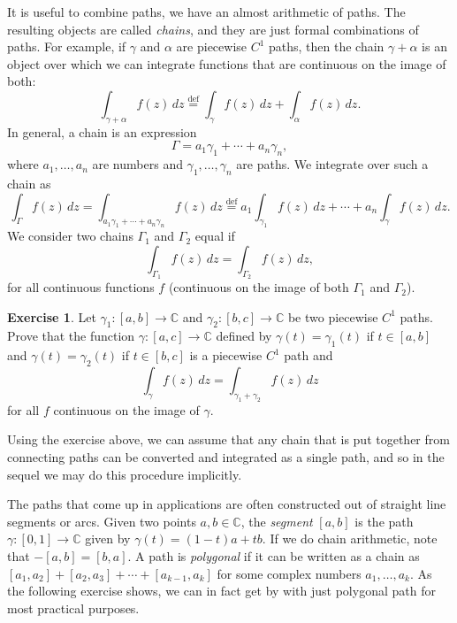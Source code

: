 \documentclass[12pt,openany]{book}
\newcommand{\C}{{\mathbb{C}}}
\newcommand{\myindex}[1]{#1\index{#1}}
\theoremstyle{plain}
\theoremstyle{remark}
\theoremstyle{definition}
\newenvironment{exbox}{%
    \def\FrameCommand{\vrule width 1pt \relax\hspace {10pt}}%
    \MakeFramed {\advance \hsize -\width \FrameRestore }%
}{%
    \endMakeFramed
}
\theoremstyle{exercise}
\newtheorem{exercise}{Exercise}[section]
\theoremstyle{example}
\begin{document}
It is useful to combine paths, we have an almost arithmetic of paths.
The resulting objects are called \emph{chains}, and they
are just formal combinations of paths.  For example, if $\gamma$
and $\alpha$ are piecewise $C^1$ paths, then the chain  $\gamma+\alpha$
is an object over which we can integrate functions that are continuous
on the image of both:
\begin{equation*}
\int_{\gamma + \alpha} f(z) \, dz
\overset{\text{def}}{=}
\int_{\gamma} f(z) \, dz +
\int_{\alpha} f(z) \, dz .
\end{equation*}
In general, a chain is an expression
\begin{equation*}
\Gamma = a_1 \gamma_1 + \cdots + a_n \gamma_n ,
\end{equation*}
where $a_1,\ldots,a_n$ are numbers and $\gamma_1,\ldots,\gamma_n$
are paths.  We integrate over such a chain as
\begin{equation*}
\int_{\Gamma} f(z) \, dz
=
\int_{a_1 \gamma_1 + \cdots + a_n \gamma_n} f(z) \, dz
\overset{\text{def}}{=}
a_1 \int_{\gamma_1} f(z) \, dz +
\cdots
+
a_n \int_{\gamma} f(z) \, dz .
\end{equation*}
We consider two chains $\Gamma_1$ and $\Gamma_2$ equal if
\begin{equation*}
\int_{\Gamma_1} f(z) \, dz = 
\int_{\Gamma_2} f(z) \, dz ,
\end{equation*}
for all continuous functions $f$ (continuous on the image of both $\Gamma_1$
and $\Gamma_2$).

\begin{exbox}
\begin{exercise}
Let $\gamma_1 \colon [a,b] \to \C$ and $\gamma_2 \colon [b,c] \to \C$
be two piecewise $C^1$ paths.  Prove that the function $\gamma \colon [a,c] \to
\C$ defined by $\gamma(t) = \gamma_1(t)$ if $t \in [a,b]$ and $\gamma(t)
= \gamma_2(t)$ if $t \in [b,c]$ is a piecewise $C^1$ path and
\begin{equation*}
\int_{\gamma} f(z)\,dz = \int_{\gamma_1 + \gamma_2} f(z) \, dz
\end{equation*}
for all $f$ continuous on the image of $\gamma$.
\end{exercise}
\end{exbox}

Using the exercise above, we can assume that any chain that is put together
from connecting paths can be converted and integrated as a single path,
and so in the sequel we may do this procedure implicitly.

The paths that come up in applications are often constructed out of straight
line segments or arcs.
Given two points $a,b \in \C$, the \emph{\myindex{segment}} $[a,b]$ is the path
$\gamma \colon [0,1] \to \C$ given by $\gamma(t) = (1-t)a + tb$.
If we do chain arithmetic, note that $-[a,b] = [b,a]$.
A path is \emph{\myindex{polygonal}} if it can be written as a chain
as $[a_1,a_2] + [a_2,a_3] + \cdots + [a_{k-1},a_k]$ for some complex numbers
$a_1,\ldots,a_k$.  As the following exercise shows, we can in fact get by
with just polygonal path for most practical purposes.
\end{document}

